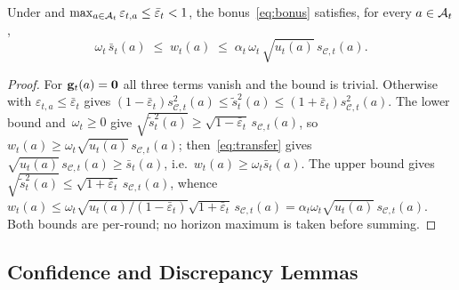 \documentclass[twoside]{article}
\newcommand{\Calg}{\mathcal{C}}                 %
\begin{document}
\begin{lemma}\label{lem:bonus}
Under  and $\max_{a\in\mathcal{A}_t}\varepsilon_{t,a}\le\bar\varepsilon_t<1$,
the bonus~\eqref{eq:bonus} satisfies, for every $a\in\mathcal{A}_t$,
\begin{equation}\label{eq:bonus-sandwich}
  \omega_t\,\bar s_t(a)
  \;\le\;
  w_t(a)
  \;\le\;
  \alpha_t\,\omega_t\,\sqrt{u_t(a)}\,s_{\Calg,t}(a).
\end{equation}
\end{lemma}
\begin{proof}
For $\mathbf{g}_t(a)=\mathbf0$ all three terms vanish and the bound is trivial.
Otherwise  with $\varepsilon_{t,a}\le\bar\varepsilon_t$ gives
$(1-\bar\varepsilon_t)s_{\Calg,t}^2(a)\le\tilde s_t^2(a)\le
(1+\bar\varepsilon_t)s_{\Calg,t}^2(a)$.  The lower bound and~$\omega_t\ge0$
give $\sqrt{\tilde s_t^2(a)}\ge\sqrt{1-\bar\varepsilon_t}\,s_{\Calg,t}(a)$,
so $w_t(a)\ge\omega_t\sqrt{u_t(a)}\,s_{\Calg,t}(a)$; then~\eqref{eq:transfer}
gives $\sqrt{u_t(a)}\,s_{\Calg,t}(a)\ge\bar s_t(a)$, i.e.\
$w_t(a)\ge\omega_t\bar s_t(a)$.  The upper bound gives
$\sqrt{\tilde s_t^2(a)}\le\sqrt{1+\bar\varepsilon_t}\,s_{\Calg,t}(a)$, whence
$w_t(a)\le\omega_t\sqrt{u_t(a)/(1-\bar\varepsilon_t)}\sqrt{1+\bar\varepsilon_t}\,
s_{\Calg,t}(a)=\alpha_t\omega_t\sqrt{u_t(a)}\,s_{\Calg,t}(a)$.
Both bounds are per-round; no horizon maximum is taken before summing.
\end{proof}



\subsection{Confidence and Discrepancy Lemmas}
\end{document}

